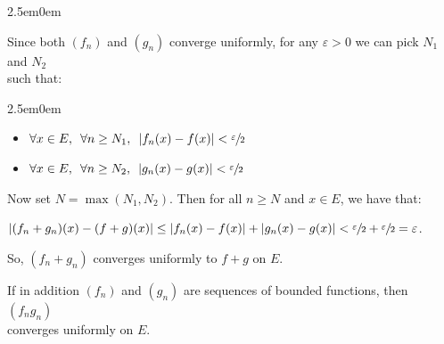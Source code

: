 \documentclass{book}
\newcommand{\pracTwo}{
   \color{Orange}%
   \fontsize{12}{14}\selectfont%
}
\newenvironment{myIndent}{%
   \begin{adjustwidth}{2.5em}{0em}%
}{%
   \end{adjustwidth}%
}
\newcommand{\myHS}{ \hspace{0.5em}}
\newcommand{\retTwo}{\hfill\bigbreak}
\begin{document}
{\begin{myIndent}\pracTwo
   Since both $(f_n)$ and $(g_n)$ converge uniformly, for any $\varepsilon > 0$ we can pick $N_1$ and $N_2$\\ such that:
   \begin{myIndent}
      \begin{itemize}
         \item $\forall x \in E,\myHS \forall n \geq N_1,\myHS |f_n(x) - f(x)| < \sfrac{\varepsilon}{2}$
         \item $\forall x \in E,\myHS \forall n \geq N_2,\myHS |g_n(x) - g(x)| < \sfrac{\varepsilon}{2}$\retTwo
      \end{itemize}
   \end{myIndent}

   Now set $N = \max(N_1, N_2)$. Then for all $n \geq N$ and $x \in E$, we have that:

   {\centering $|(f_n + g_n)(x) - (f + g)(x)| \leq |f_n(x) - f(x)| + |g_n(x) - g(x)| < \sfrac{\varepsilon}{2} + \sfrac{\varepsilon}{2} = \varepsilon$. \retTwo\par}
   
   So, $(f_n + g_n)$ converges uniformly to $f + g$ on $E$.\retTwo
\end{myIndent}}

If in addition $(f_n)$ and $(g_n)$ are sequences of bounded functions, then $(f_ng_n)$\\ converges uniformly on $E$.\\ [-9pt]
\end{document}
